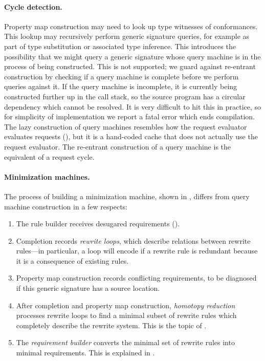 \documentclass[../generics]{subfiles}
\begin{document}
\paragraph{Cycle detection.}
Property map construction may need to look up type witnesses of conformances. This lookup may recursively perform generic signature queries, for example as part of type substitution or associated type inference. This introduces the possibility that we might query a generic signature whose query machine is in the process of being constructed. This is not supported; we guard against re-entrant construction by checking if a query machine is complete before we perform queries against it. If the query machine is incomplete, it is currently being constructed further up in the call stack, so the source program has a circular dependency which cannot be resolved. It is very difficult to hit this in practice, so for simplicity of implementation we report a fatal error which ends compilation. The lazy construction of query machines resembles how the request evaluator evaluates requests (), but it is a hand-coded cache that does not actually use the request evaluator. The re-entrant construction of a query machine is the equivalent of a request cycle.

\paragraph{Minimization machines.}
The process of building a minimization machine, shown in , differs from query machine construction in a few respects:
\begin{enumerate}
\item The rule builder receives desugared requirements ().
\item Completion records \emph{rewrite loops}, which describe relations between rewrite rules---in particular, a loop will encode if a rewrite rule is redundant because it is a consequence of existing rules.
\item Property map construction records conflicting requirements, to be diagnosed if this generic signature has a source location.
\item After completion and property map construction, \emph{homotopy reduction} processes rewrite loops to find a minimal subset of rewrite rules which completely describe the rewrite system. This is the topic of .
\item The \emph{requirement builder} converts the minimal set of rewrite rules into minimal requirements. This is explained in .
\end{enumerate}
\end{document}
